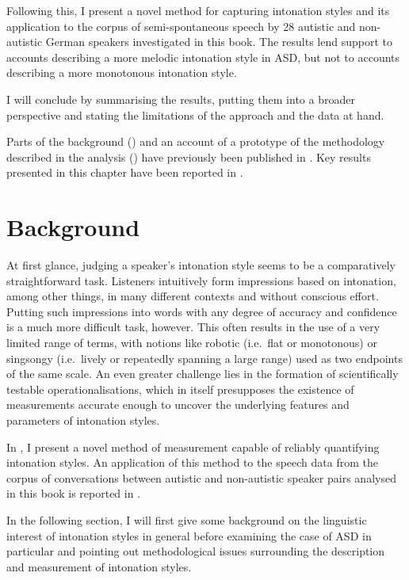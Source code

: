 Following this, I present a novel method for capturing intonation styles and its application to the corpus of semi-spontaneous speech by 28 autistic and non-autistic German speakers investigated in this book. The results lend support to accounts describing a more melodic intonation style in ASD, but not to accounts describing a more monotonous intonation style.

I will conclude by summarising the results, putting them into a broader perspective and stating the limitations of the approach and the data at hand.

Parts of the background () and an account of a prototype of the methodology described in the analysis () have previously been published in \citet{wehrleSomewhereSpectrumRobotic2018,wehrleNewEvidenceMelodic2022c}. Key results presented in this chapter have been reported in \citet{wehrleAssessingIntonationStyle2020, wehrleNewEvidenceMelodic2022c}.



\section{Background}\label{sec:intonation_background}

At first glance, judging a speaker's intonation style seems to be a comparatively straightforward task. Listeners intuitively form impressions based on intonation, among other things, in many different contexts and without conscious effort. Putting such impressions into words with any degree of accuracy and confidence is a much more difficult task, however. This often results in the use of a very limited range of terms, with notions like robotic (i.e.~flat or monotonous) or singsongy (i.e.~lively or repeatedly spanning a large range) used as two endpoints of the same scale. An even greater challenge lies in the formation of scientifically testable operationalisations, which in itself presupposes the existence of measurements accurate enough to uncover the underlying features and parameters of intonation styles.

In , I present a novel method of measurement capable of reliably quantifying intonation styles. An application of this method to the speech data from the corpus of conversations between autistic and non-autistic speaker pairs analysed in this book is reported in .

In the following section, I will first give some background on the linguistic interest of intonation styles in general before examining the case of ASD in particular and pointing out methodological issues surrounding the description and measurement of intonation styles.

